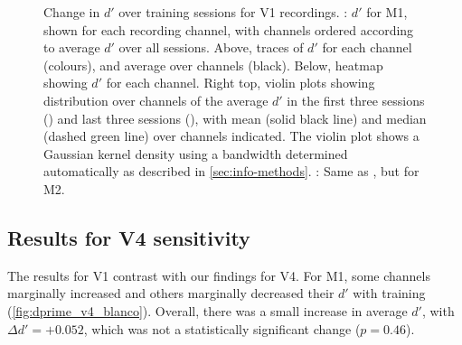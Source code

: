 \begin{figure}[htbp]
    \centering
    \hspace*{\fill}
    \hspace*{\fill}\hspace{.2cm}\hspace*{\fill}
    \hspace*{\fill}
    \caption{Change in $d'$ over training sessions for \ac{V1} recordings.
\protect{}: $d'$ for \ac{M1}, shown for each recording channel, with channels ordered according to average $d'$ over all sessions.
Above, traces of $d'$ for each channel (colours), and average over channels (black).
Below, heatmap showing $d'$ for each channel.
Right top, violin plots showing distribution over channels of the average $d'$ in the first three sessions () and last three sessions (), with mean (solid black line) and median (dashed green line) over channels indicated.
The violin plot shows a Gaussian kernel density using a bandwidth determined automatically as described in \autoref{sec:info-methods}.
\protect{}: Same as \protect{}, but for \ac{M2}.
}
    \label{fig:dprime_v1}
\end{figure}


\subsection{Results for \acs{V4} sensitivity}
\label{sec:pl_dprime_v4}


The results for \ac{V1} contrast with our findings for \ac{V4}.
For \ac{M1}, some channels marginally increased and others marginally decreased their $d'$ with training (\autoref{fig:dprime_v4_blanco}).
Overall, there was a small increase in average $d'$, with $\Delta d' = +0.052$, which was not a statistically significant change ($p=0.46$).

